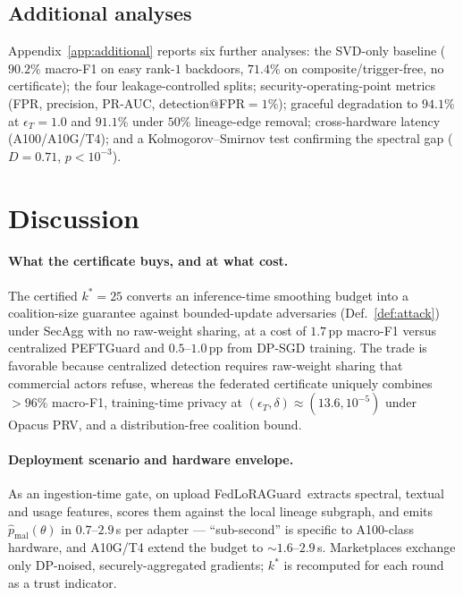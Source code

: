 \documentclass[11pt]{article}
\theoremstyle{plain}
\theoremstyle{definition}
\theoremstyle{remark}
\newcommand{\modelname}{FedLoRAGuard}
\begin{document}
\subsection{Additional analyses}
Appendix~\ref{app:additional} reports six further analyses: the
SVD-only baseline ($90.2\%$ macro-F1 on easy rank-$1$ backdoors,
$71.4\%$ on composite/trigger-free, no certificate); the four
leakage-controlled splits; security-operating-point metrics (FPR,
precision, PR-AUC, detection@FPR$\!=\!1\%$); graceful degradation
to $94.1\%$ at $\epsilon_T\!=\!1.0$ and $91.1\%$ under $50\%$
lineage-edge removal; cross-hardware latency (A100/A10G/T4); and
a Kolmogorov--Smirnov test confirming the spectral gap
($D\!=\!0.71$, $p\!<\!10^{-3}$).

\section{Discussion}
\label{sec:discussion}

\paragraph{What the certificate buys, and at what cost.}
The certified $k^*\!=\!25$ converts an inference-time smoothing
budget into a coalition-size guarantee against bounded-update
adversaries (Def.~\ref{def:attack}) under SecAgg with no
raw-weight sharing, at a cost of $1.7$\,pp macro-F1 versus
centralized PEFTGuard and $0.5$--$1.0$\,pp from DP-SGD training.
The trade is favorable because centralized detection requires
raw-weight sharing that commercial actors refuse, whereas the
federated certificate uniquely combines ${>}96\%$ macro-F1,
training-time privacy at
$(\epsilon_T,\delta)\!\approx\!(13.6,10^{-5})$ under Opacus PRV,
and a distribution-free coalition bound.

\paragraph{Deployment scenario and hardware envelope.}
As an ingestion-time gate, on upload \modelname\ extracts
spectral, textual and usage features, scores them against the
local lineage subgraph, and emits
$\hat{p}_{\mathrm{mal}}(\theta)$ in
$0.7$--$2.9$\,s per adapter --- ``sub-second'' is specific to
A100-class hardware, and A10G/T4 extend the budget to
${\sim}1.6$--$2.9$\,s. Marketplaces exchange only DP-noised,
securely-aggregated gradients; $k^*$ is recomputed for each round as
a trust indicator.
\end{document}
